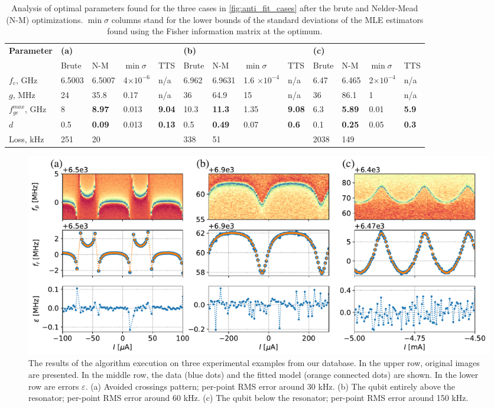 \documentclass[%
 aip,
 draft,
 amsmath,amssymb,
 reprint,%
]{revtex4-1}
\begin{document}
\begin{table}
	\centering
	\begin{ruledtabular}
		\renewcommand{\arraystretch}{1.2}

		\begin{tabular}{*{13}{l}} 
			\multirow{2}{*}{\textbf{Parameter}} & 
			\multicolumn{4}{l}{\textbf{(a)}} & 
			\multicolumn{4}{l}{\textbf{(b)}} & \multicolumn{4}{l}{\textbf{(c)}}\\
			& Brute & N-M & $\min \sigma$ & TTS  & Brute & N-M & $\min \sigma$ & TTS  & Brute& N-M & $\min \sigma$ & TTS  \\
			\hline
			$f_c$, GHz &6.5003 & 6.5007 &  4$\times 10^{-6}$ & n/a & 6.962 & 6.9631 & 1.6 $\times 10^{-4}$  & n/a &  6.47 & 6.465& 2$\times 10^{-4}$ & n/a\\ 
			$g$, MHz & 24 & 35.8 & 0.17 & n/a & 36 & 64.9 & 15 & n/a & 36 & 86.1& 1 &n/a\\
			$f_{ge}^{max}$, GHz & 8 &\textbf{8.97} & 0.013 & \textbf{9.04} &10.3& \textbf{11.3}& 1.35 & \textbf{9.08}& 6.3& \textbf{5.89}&0.01&\textbf{5.9}\\
			$d$ &0.5& \textbf{0.09}& 0.013& \textbf{0.13} &0.5&\textbf{0.49} &0.07&\textbf{0.6}&0.1& \textbf{0.25} & 0.05 &\textbf{0.3} \\\hline
			Loss, kHz & 251 & 20 && &338& 51 & & &2038& 149&&
		\end{tabular} 
	\end{ruledtabular}
	\caption{Analysis of optimal parameters found for the three cases in \autoref{fig:anti_fit_cases} after the brute and Nelder-Mead (N-M) optimizations. $\min \sigma$ columns stand for the lower bounds of the standard deviations of the MLE estimators found using the Fisher information matrix at the optimum.}
	\label{tab:sts_results}
\end{table}

\begin{figure}
	\centering
	\includegraphics[width=\linewidth]{fit_cases}
	\caption{The results of the algorithm execution on three experimental examples from our database. In the upper row, original images are presented. In the middle row, the data  (blue dots) and the fitted model (orange connected dots) are shown. In the lower row are errors $\varepsilon$. (a) Avoided crossings pattern; per-point RMS error around 30 kHz. (b) The qubit entirely above the resonator; per-point RMS error around 60 kHz. (c) The qubit below the resonator; per-point RMS error around 150 kHz.}
	\label{fig:anti_fit_cases}
\end{figure}
\end{document}
